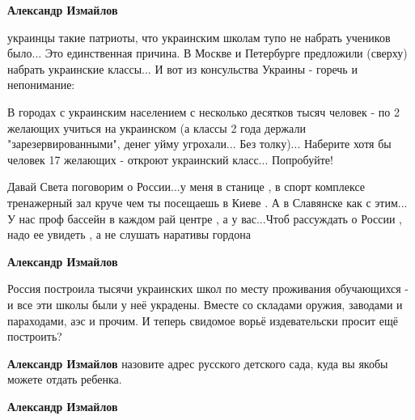 \begin{itemize}
\begin{itemize}
\textbf{Александр Измайлов} 

украинцы такие патриоты, что украинским школам тупо не набрать учеников было...
Это единственная причина. В Москве и Петербурге предложили (сверху) набрать
украинские классы... И вот из консульства Украины - горечь и непонимание:

В городах с украинским населением с несколько десятков тысяч человек - по 2
желающих учиться на украинском (а классы 2 года держали "зарезервированными",
денег уйму угрохали... Без толку)... Наберите хотя бы человек 17 желающих -
откроют украинский класс... Попробуйте!

 

Давай Света поговорим о России...у меня в станице , в спорт комплексе
тренажерный зал круче чем ты посещаешь в Киеве . А в Славянске как с этим... У
нас проф бассейн в каждом рай центре , а у вас...Чтоб рассуждать о России ,
надо ее увидеть , а не слушать наративы гордона


 
\textbf{Александр Измайлов} 

Россия построила тысячи украинских школ по месту проживания обучающихся - и все
эти школы были у неё украдены. Вместе со складами оружия, заводами и
параходами, аэс и прочим. И теперь свидомое ворьё издевательски просит ещё
построить?

 
\textbf{Александр Измайлов} назовите адрес русского детского сада, куда вы якобы можете отдать ребенка.

 
\textbf{Александр Измайлов} 


\end{itemize}
\end{itemize}
